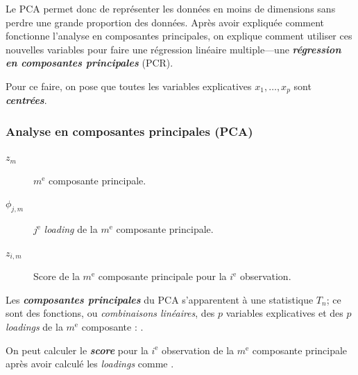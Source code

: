 \documentclass[french]{article}
\begin{document}
\begin{multicols*}{2}
\begin{rappel_enhanced}[Contexte]
\bigskip

Le PCA permet donc de représenter les données en moins de dimensions sans perdre une grande proportion des données. Après avoir expliquée comment fonctionne l'analyse en composantes principales, on explique comment utiliser ces nouvelles variables pour faire une régression linéaire multiple---une \textbf{\textit{régression en composantes principales}} (PCR). 

\bigskip

Pour ce faire, on pose que toutes les variables explicatives $x_{1}, \dots, x_{p}$ sont \textbf{\textit{centrées}}.
\end{rappel_enhanced}


\subsubsection{Analyse en composantes principales (PCA)}\label{subsubsec:PCA}
\begin{distributions}[Notation]
\begin{description}
	\item[$z_{m}$]	$m^{\text{e}}$ composante principale.
	\item[$\phi_{j, m}$]	$j^{\text{e}}$ \og \textit{loading} \fg{} de la $m^{\text{e}}$ composante principale.
	\item[$z_{i, m}$]	Score de la $m^{\text{e}}$ composante principale pour la $i^{\text{e}}$ observation.
\end{description}
\end{distributions}


\begin{definitionNOHFILLsub}
Les \textbf{\textit{composantes principales}} du PCA s'apparentent à une statistique $T_{n}$; ce sont des fonctions, ou \textit{combinaisons linéaires}, des $p$ variables explicatives et des $p$ \og \textit{loadings} \fg{} de la $m^{\text{e}}$ composante : .
\end{definitionNOHFILLsub}

\begin{definitionNOHFILLsub}[Scores]
On peut calculer le \textbf{\textit{score}} pour la $i^{\text{e}}$ observation de la $m^{\text{e}}$ composante principale après avoir calculé les \og \textit{loadings} \fg{} comme .
\end{definitionNOHFILLsub}


\end{multicols*}
\end{document}

